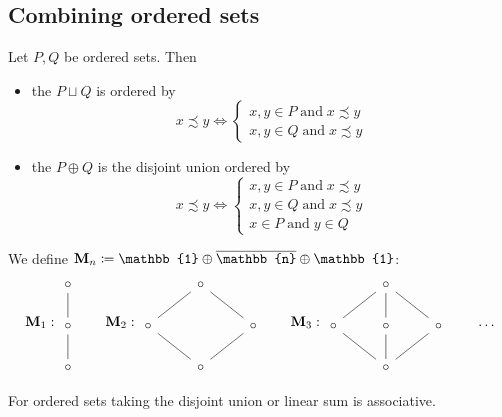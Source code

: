 \subsection{Combining ordered sets}
\begin{definition}
Let $P,Q$ be ordered sets. Then
\begin{itemize}
\item the  $P\sqcup Q$ is ordered by
\[ x\precsim y \iff \begin{cases}
x,y\in P \;\text{and}\; x\precsim y \\
x,y\in Q \;\text{and}\; x\precsim y
\end{cases} \]
\item the  $P\oplus Q$ is the disjoint union ordered by
\[ x\precsim y \iff \begin{cases}
x,y\in P \;\text{and}\; x\precsim y \\
x,y\in Q \;\text{and}\; x\precsim y \\
x\in P \;\text{and}\; y\in Q
\end{cases} \]
\end{itemize}
\end{definition}

\begin{example}
We define $\mathbf{M}_n \defeq \mathbb{1}\oplus \overline{\mathbb{n}} \oplus \mathbb{1}$:
\[ \mathbf{M}_1: \begin{tikzcd}
\circ \ar[d, dash] \\ \circ \ar[d, dash] \\ \circ
\end{tikzcd} \qquad \mathbf{M}_2: \begin{tikzcd}
&\circ \ar[ld, dash] \ar[rd, dash] & \\ \circ \ar[rd, dash] && \circ \ar[ld, dash] \\ &\circ &
\end{tikzcd} \qquad \mathbf{M}_3: \begin{tikzcd}
&\circ \ar[ld, dash] \ar[d,dash] \ar[rd, dash] &\\ \circ \ar[rd, dash]& \circ \ar[d, dash] & \circ \ar[ld, dash] \\ &\circ &
\end{tikzcd} \qquad \hdots \]
\end{example}

\begin{lemma}
For ordered sets taking the disjoint union or linear sum is associative.
\end{lemma}

